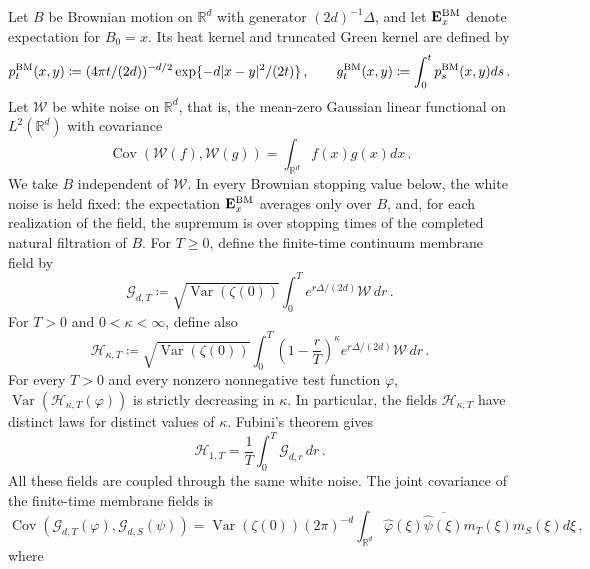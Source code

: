 \documentclass[11pt]{amsart}
\theoremstyle{plain}
\theoremstyle{definition}
\newcommand{\R}{\mathbb{R}}
\DeclareMathOperator{\Var}{Var}
\DeclareMathOperator{\Cov}{Cov}
\begin{document}
	Let $B$ be Brownian motion on $\R^d$ with generator $(2d)^{-1}\Delta$, and
	let $\mathbf E_x^{\rm BM}$ denote expectation for $B_0=x$. Its heat kernel
	and truncated Green kernel are defined by
	\begin{equation}\label{eq:brownian-heat-green-kernels}
		p_t^{\rm BM}(x,y)\coloneqq(4\pi t/(2d))^{-d/2}\exp\{-d|x-y|^2/(2t)\}\, ,
		\qquad
		g_t^{\rm BM}(x,y)\coloneqq \int_0^t p_s^{\rm BM}(x,y) ds \, .
	\end{equation}
	Let $\mathcal W$ be white noise on $\R^d$, that is, the mean-zero Gaussian
	linear functional on $L^2(\R^d)$ with covariance
	\[
		\Cov(\mathcal W(f),\mathcal W(g))=\int_{\R^d}f(x)g(x)dx\, .
	\]
	We take $B$ independent of $\mathcal W$. In every Brownian stopping value
	below, the white noise is held fixed: the expectation $\mathbf E_x^{\rm BM}$ averages only over $B$, and, for each realization of the field, the supremum is over stopping times of the completed natural filtration of $B$. For $T\geq0$, define the finite-time continuum membrane field by
	\begin{equation}\label{eq:finite-time-continuum-membrane}
		\mathcal G_{d,T}\coloneqq
		\sqrt{\Var(\zeta(0))}\int_0^T e^{r\Delta/(2d)}\mathcal W\,dr\, .
	\end{equation}
	For $T>0$ and $0<\kappa<\infty$, define also
	\begin{equation}\label{eq:power-weighted-continuum-membrane}
		\mathcal H_{\kappa,T}\coloneqq
		\sqrt{\Var(\zeta(0))}
		\int_0^T\left(1-\frac rT\right)^\kappa
		e^{r\Delta/(2d)}\mathcal W\,dr\, .
	\end{equation}
	For every $T>0$ and every nonzero nonnegative test function $\varphi$,
	$\Var(\mathcal H_{\kappa,T}(\varphi))$ is strictly decreasing in $\kappa$.
	In particular, the fields $\mathcal H_{\kappa,T}$ have distinct laws for
	distinct values of $\kappa$.
	Fubini's theorem gives
	\begin{equation}\label{eq:time-averaged-continuum-membrane}
		\mathcal H_{1,T}=\frac1T\int_0^T\mathcal G_{d,r}\,dr\, .
	\end{equation}
	All these fields are coupled through the same white noise. The joint
	covariance of the finite-time membrane fields is
	\begin{equation}\label{eq:dgt4-finite-time-membrane-covariance}
		\Cov(\mathcal G_{d,T}(\varphi),\mathcal G_{d,S}(\psi))
		=
		\Var(\zeta(0))(2\pi)^{-d}
		\int_{\R^d}
		\widehat\varphi(\xi)\overline{\widehat\psi(\xi)}
		m_T(\xi)m_S(\xi)d\xi\, ,
	\end{equation}
	where
\end{document}
